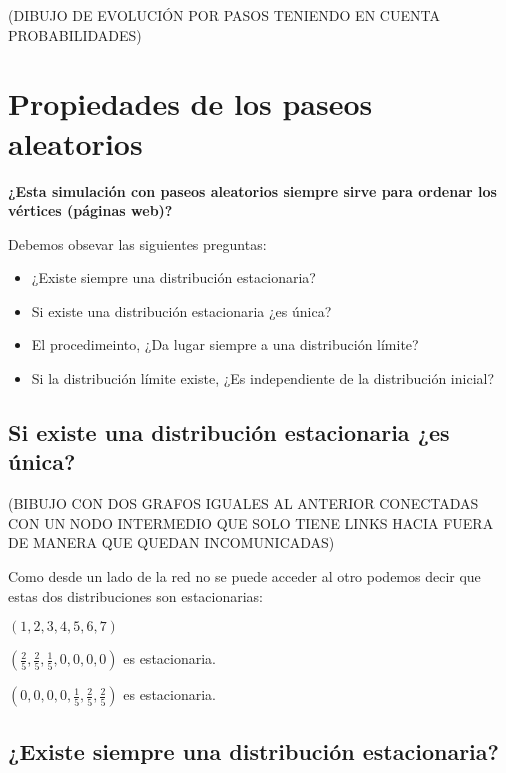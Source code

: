 (DIBUJO DE EVOLUCIÓN POR PASOS TENIENDO EN CUENTA PROBABILIDADES)

\section{Propiedades de los paseos aleatorios}

\textbf{¿Esta simulación con paseos aleatorios siempre sirve para ordenar los vértices (páginas web)?}

Debemos obsevar las siguientes preguntas:

\begin{itemize}
	\item ¿Existe siempre una distribución estacionaria?
	\item Si existe una distribución estacionaria ¿es única?
	\item El procedimeinto, ¿Da lugar siempre a una distribución límite?
	\item Si la distribución límite existe, ¿Es independiente de la distribución inicial?

\end{itemize}

\subsection{Si existe una distribución estacionaria ¿es única?}
\label{P2}

(BIBUJO CON DOS GRAFOS IGUALES AL ANTERIOR CONECTADAS CON UN NODO INTERMEDIO QUE SOLO TIENE LINKS HACIA FUERA DE MANERA QUE QUEDAN INCOMUNICADAS)

Como desde un lado de la red no se puede acceder al otro podemos decir que estas dos distribuciones son estacionarias:

$(1, 2, 3, 4, 5, 6, 7)$

$(\frac{2}{5},\frac{2}{5},\frac{1}{5}, 0, 0 , 0, 0)$ es estacionaria.

$(0, 0, 0, 0, \frac{1}{5}, \frac{2}{5}, \frac{2}{5})$ es estacionaria.


\subsection{¿Existe siempre una distribución estacionaria?}

